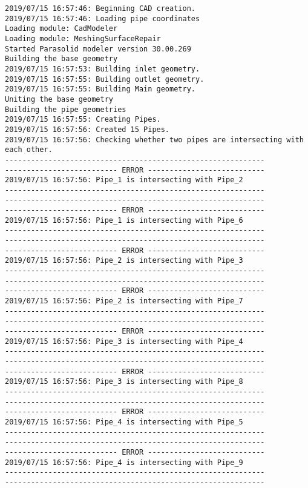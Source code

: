 \documentclass{article}
\begin{document}
{\tiny 
\begin{verbatim}
2019/07/15 16:57:46: Beginning CAD creation.
2019/07/15 16:57:46: Loading pipe coordinates
Loading module: CadModeler
Loading module: MeshingSurfaceRepair
Started Parasolid modeler version 30.00.269
Building the base geometry
2019/07/15 16:57:53: Building inlet geometry.
2019/07/15 16:57:55: Building outlet geometry.
2019/07/15 16:57:55: Building Main geometry.
Uniting the base geometry
Building the pipe geometries
2019/07/15 16:57:55: Creating Pipes.
2019/07/15 16:57:56: Created 15 Pipes.
2019/07/15 16:57:56: Checking whether two pipes are intersecting with each other.
------------------------------------------------------------
-------------------------- ERROR ---------------------------
2019/07/15 16:57:56: Pipe_1 is intersecting with Pipe_2
------------------------------------------------------------
------------------------------------------------------------
-------------------------- ERROR ---------------------------
2019/07/15 16:57:56: Pipe_1 is intersecting with Pipe_6
------------------------------------------------------------
------------------------------------------------------------
-------------------------- ERROR ---------------------------
2019/07/15 16:57:56: Pipe_2 is intersecting with Pipe_3
------------------------------------------------------------
------------------------------------------------------------
-------------------------- ERROR ---------------------------
2019/07/15 16:57:56: Pipe_2 is intersecting with Pipe_7
------------------------------------------------------------
------------------------------------------------------------
-------------------------- ERROR ---------------------------
2019/07/15 16:57:56: Pipe_3 is intersecting with Pipe_4
------------------------------------------------------------
------------------------------------------------------------
-------------------------- ERROR ---------------------------
2019/07/15 16:57:56: Pipe_3 is intersecting with Pipe_8
------------------------------------------------------------
------------------------------------------------------------
-------------------------- ERROR ---------------------------
2019/07/15 16:57:56: Pipe_4 is intersecting with Pipe_5
------------------------------------------------------------
------------------------------------------------------------
-------------------------- ERROR ---------------------------
2019/07/15 16:57:56: Pipe_4 is intersecting with Pipe_9
------------------------------------------------------------
------------------------------------------------------------

\end{verbatim}}
\end{document}
